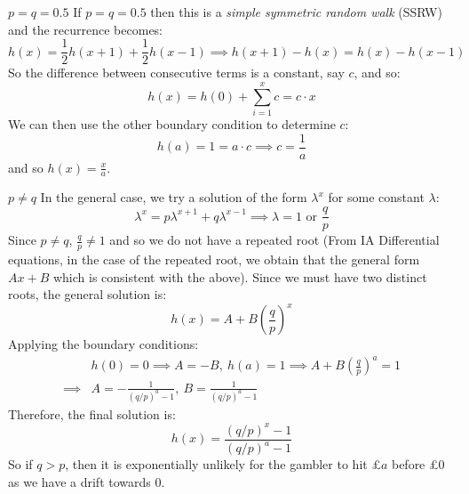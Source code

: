 \documentclass[../main.tex]{subfiles}
\begin{document}
\begin{proofcases}
  \begin{case}{$p = q = 0.5$}
    If $p = q = 0.5$ then this is a \textit{simple symmetric random walk} (SSRW) and the recurrence becomes:
    \[
      h(x) = \frac{1}{2}h(x + 1) + \frac{1}{2}h(x - 1) \implies h(x + 1) - h(x) = h(x) - h(x - 1)
    \]
    So the difference between consecutive terms is a constant, say $c$, and so:
    \[
      h(x) = h(0) + \sum_{i = 1}^{x} c = c \cdot x
    \]
    We can then use the other boundary condition to determine $c$:
    \[
      h(a) = 1 = a \cdot c \implies c = \frac{1}{a}
    \]
    and so $h(x) = \frac{x}{a}$.
  \end{case}
  \begin{case}{$p \neq q$}
    In the general case, we try a solution of the form $\lambda^{x}$ for some constant $\lambda$:
    \begin{equation}
      \lambda^{x} = p \lambda^{x + 1} + q \lambda^{x - 1} \implies \lambda = 1 \text{ or } \frac{q}{p} \label{homogenousRecurrence}
    \end{equation}
    Since $p \neq q$, $\frac{q}{p} \neq 1$ and so we do not have a repeated root (From IA Differential equations, in the case of the repeated root, we obtain that the general form $Ax + B$ which is consistent with the above).
    Since we must have two distinct roots, the general solution is:
    \[
      h(x) = A + B \left(\frac{q}{p}\right)^{x}
    \]
    Applying the boundary conditions:
    \begin{align*}
      &h(0) = 0 \implies A = -B,\ h(a) = 1 \implies A + B\left(\frac{q}{p}\right)^{a} = 1 \\
      \implies& A = -\frac{1}{(q/p)^{a} - 1},\ B = \frac{1}{(q/p)^{a} - 1}
    \end{align*}
    Therefore, the final solution is:
    \[
      h(x) = \frac{(q/p)^{x} - 1}{(q/p)^{a} - 1}
    \]
    So if $q > p$, then it is exponentially unlikely for the gambler to hit £$a$ before £0 as we have a drift towards 0.
  \end{case}
\end{proofcases}
\end{document}
